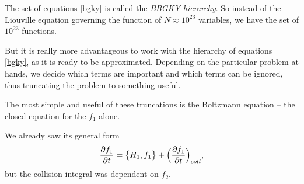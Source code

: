 The set of equations \ref{bgky} is called the \textit{BBGKY hierarchy}.
So instead of the Liouville equation governing the function of $N \approx 10^{23}$ variables, we have the set of $10^{23}$ functions. 

But it is really more advantageous to work with the hierarchy of equations \ref{bgky}, as it is ready to be approximated. Depending on the particular problem at hands, we decide which terms are important and which terms can be ignored, thus truncating the problem to something useful.

The most simple and useful of these truncations is the Boltzmann equation -- the closed equation for the $f_1$ alone.

We already saw its general form
\begin{align*}
\frac{\partial f_1}{\partial t} = \big\{ H_1, f_1 \big\} + \Big(\frac{\partial f_1}{\partial t} \Big)_{coll},
\end{align*}
but the collision integral was dependent on $f_2$.

